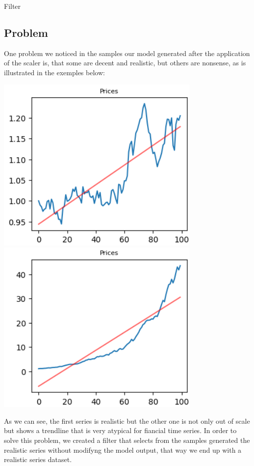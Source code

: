 \documentclass{article}
\begin{document}
\begin{center}
    {\huge{Filter}}
\end{center}    
    \begin{multicols}{2}
    \section*{Problem}
    One problem we noticed in the samples our model generated after the application of the scaler is, that some are decent and realistic, but others are 
    nonsense, as is illustrated in the exemples below:
    \begin{center}
        \includegraphics[scale=0.49]{imgs/riccardo/serie_comp_1.png}
        \includegraphics[scale=0.49]{imgs/riccardo/serie_comp_2.png}
    \end{center}
    As we can see, the first series is realistic but the other one is not only out of scale but shows a trendline that is very 
    atypical for fiancial time series. In order to solve this problem, we created a filter that selects from the samples generated the realistic series without modifyng the model output, that way we end up with a realistic series dataset.

\end{multicols}
\end{document}
